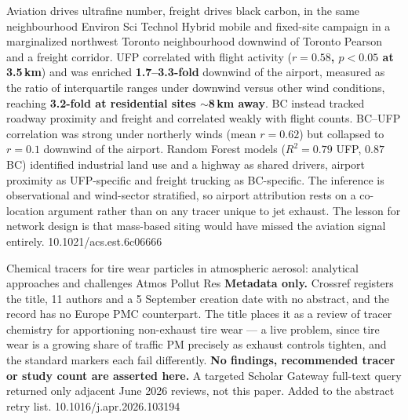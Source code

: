 \documentclass[10pt]{article}
\begin{document}
{Aviation drives ultrafine number, freight drives black carbon, in the same
neighbourhood}
{Environ Sci Technol}
{Hybrid mobile and fixed-site campaign in a marginalized northwest Toronto neighbourhood
downwind of Toronto Pearson and a freight corridor. UFP correlated with flight activity
(\textbf{$r=0.58$, $p<0.05$ at 3.5\,km}) and was enriched \textbf{1.7--3.3-fold} downwind
of the airport, measured as the ratio of interquartile ranges under downwind versus other
wind conditions, reaching \textbf{3.2-fold at residential sites $\sim$8\,km away}. BC
instead tracked roadway proximity and freight and correlated weakly with flight counts.
BC--UFP correlation was strong under northerly winds (mean $r=0.62$) but collapsed to
$r=0.1$ downwind of the airport. Random Forest models ($R^2=0.79$ UFP, $0.87$ BC)
identified industrial land use and a highway as shared drivers, airport proximity as
UFP-specific and freight trucking as BC-specific. The inference is observational and
wind-sector stratified, so airport attribution rests on a co-location argument rather than
on any tracer unique to jet exhaust. The lesson for network design is that mass-based
siting would have missed the aviation signal entirely.}
{10.1021/acs.est.6c06666}

{Chemical tracers for tire wear particles in atmospheric aerosol: analytical approaches
and challenges}
{Atmos Pollut Res}
{\textbf{Metadata only.} Crossref registers the title, 11 authors and a 5 September
creation date with no abstract, and the record has no Europe PMC counterpart. The title
places it as a review of tracer chemistry for apportioning non-exhaust tire wear ---
a live problem, since tire wear is a growing share of traffic PM precisely as exhaust
controls tighten, and the standard markers each fail differently. \textbf{No findings,
recommended tracer or study count are asserted here.} A targeted Scholar Gateway
full-text query returned only adjacent June 2026 reviews, not this paper. Added to the
abstract retry list.}
{10.1016/j.apr.2026.103194}

\end{document}
